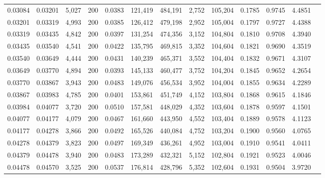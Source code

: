 \begin{tabular}{rrrrrrrrrrrrr}
0.03084 & 0.03201 &  5,027 & 200 &                                     0.0383 & 121,419 & 484,191 &   2,752 & 105,204 & 0.1785 & 0.9745 & 4.4851 \\
0.03201 & 0.03319 &  4,993 & 200 &                                     0.0385 & 126,412 & 479,198 &   2,952 & 105,004 & 0.1797 & 0.9727 & 4.4388 \\
0.03319 & 0.03435 &  4,842 & 200 &                                     0.0397 & 131,254 & 474,356 &   3,152 & 104,804 & 0.1810 & 0.9708 & 4.3940 \\
0.03435 & 0.03540 &  4,541 & 200 &                                     0.0422 & 135,795 & 469,815 &   3,352 & 104,604 & 0.1821 & 0.9690 & 4.3519 \\
0.03540 & 0.03649 &  4,444 & 200 &                                     0.0431 & 140,239 & 465,371 &   3,552 & 104,404 & 0.1832 & 0.9671 & 4.3107 \\
0.03649 & 0.03770 &  4,894 & 200 &                                     0.0393 & 145,133 & 460,477 &   3,752 & 104,204 & 0.1845 & 0.9652 & 4.2654 \\
0.03770 & 0.03867 &  3,943 & 200 &                                     0.0483 & 149,076 & 456,534 &   3,952 & 104,004 & 0.1855 & 0.9634 & 4.2289 \\
0.03867 & 0.03983 &  4,785 & 200 &                                     0.0401 & 153,861 & 451,749 &   4,152 & 103,804 & 0.1868 & 0.9615 & 4.1846 \\
0.03984 & 0.04077 &  3,720 & 200 &                                     0.0510 & 157,581 & 448,029 &   4,352 & 103,604 & 0.1878 & 0.9597 & 4.1501 \\
0.04077 & 0.04177 &  4,079 & 200 &                                     0.0467 & 161,660 & 443,950 &   4,552 & 103,404 & 0.1889 & 0.9578 & 4.1123 \\
0.04177 & 0.04278 &  3,866 & 200 &                                     0.0492 & 165,526 & 440,084 &   4,752 & 103,204 & 0.1900 & 0.9560 & 4.0765 \\
0.04278 & 0.04379 &  3,823 & 200 &                                     0.0497 & 169,349 & 436,261 &   4,952 & 103,004 & 0.1910 & 0.9541 & 4.0411 \\
0.04379 & 0.04478 &  3,940 & 200 &                                     0.0483 & 173,289 & 432,321 &   5,152 & 102,804 & 0.1921 & 0.9523 & 4.0046 \\
0.04478 & 0.04570 &  3,525 & 200 &                                     0.0537 & 176,814 & 428,796 &   5,352 & 102,604 & 0.1931 & 0.9504 & 3.9720 \\

\end{tabular}
